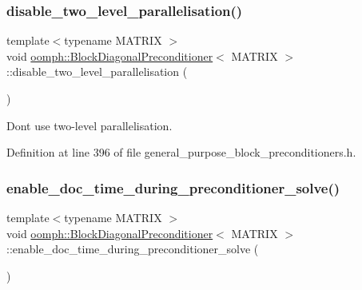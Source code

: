 \subsubsection{\texorpdfstring{disable\+\_\+two\+\_\+level\+\_\+parallelisation()}{disable\_two\_level\_parallelisation()}}
{\footnotesize\ttfamily template$<$typename M\+A\+T\+R\+IX $>$ \\
void \hyperlink{classoomph_1_1BlockDiagonalPreconditioner}{oomph\+::\+Block\+Diagonal\+Preconditioner}$<$ M\+A\+T\+R\+IX $>$\+::disable\+\_\+two\+\_\+level\+\_\+parallelisation (\begin{DoxyParamCaption}{ }\end{DoxyParamCaption})\hspace{0.3cm}{\ttfamily [inline]}}



Don\textquotesingle{}t use two-\/level parallelisation. 



Definition at line 396 of file general\+\_\+purpose\+\_\+block\+\_\+preconditioners.\+h.

\mbox{\label{classoomph_1_1BlockDiagonalPreconditioner_a8b92dd0d3fba742334061711ce431b39}} 
\subsubsection{\texorpdfstring{enable\+\_\+doc\+\_\+time\+\_\+during\+\_\+preconditioner\+\_\+solve()}{enable\_doc\_time\_during\_preconditioner\_solve()}}
{\footnotesize\ttfamily template$<$typename M\+A\+T\+R\+IX $>$ \\
void \hyperlink{classoomph_1_1BlockDiagonalPreconditioner}{oomph\+::\+Block\+Diagonal\+Preconditioner}$<$ M\+A\+T\+R\+IX $>$\+::enable\+\_\+doc\+\_\+time\+\_\+during\+\_\+preconditioner\+\_\+solve (\begin{DoxyParamCaption}{ }\end{DoxyParamCaption})\hspace{0.3cm}{\ttfamily [inline]}}



